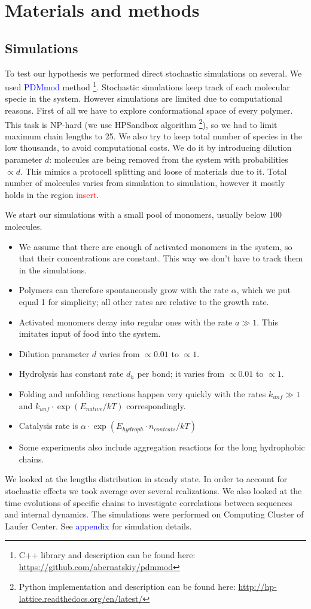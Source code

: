\documentclass[12pt]{paper}
\newcommand{\ga}{\alpha}
\newcommand{\red}[1]{\textcolor{red}{#1}}
\newcommand{\blue}[1]{\textcolor{blue}{#1}}
\begin{document}
\section{Materials and methods}
\subsection{Simulations}
To test our hypothesis we performed direct stochastic simulations on several. We used 
\blue{PDMmod} method \cite{Bernatskiy}\footnote{C++ library and description can be found 
here: \url{https://github.com/abernatskiy/pdmmod}}. Stochastic simulations keep track of each 
molecular specie in the system. However simulations are limited due to computational reasons. First 
of all we have to explore conformational space of every polymer. This task is NP-hard (we use 
HPSandbox algorithm\cite{lau1989lattice,Dill2008} \footnote{Python implementation and description 
can be found here: \url{http://hp-lattice.readthedocs.org/en/latest/}}), so we had to limit 
maximum chain lengths to 25. We also try to keep total number of species in the low thousands, to 
avoid computational costs. We do it by introducing dilution parameter $d$: molecules are being 
removed from the system with probabilities $\propto d$. This mimics a protocell splitting and 
loose of materials due to it. Total number of molecules varies from simulation to simulation, 
however it mostly holds in the region \red{insert}.

We start our simulations with a small pool of monomers, usually below 100 molecules. 
\begin{itemize}
 \item We assume 
that there are enough of activated monomers in the system, so that their concentrations are 
constant. This way we don't have to track them in the simulations.
\item Polymers can therefore 
spontaneously grow with the rate $\ga$, which we put equal 1 for simplicity; all other rates are 
relative to the growth rate.
\item Activated monomers decay into regular ones with the rate $a\gg1$. This 
imitates input of food into the system. 
\item Dilution parameter $d$ varies from $\propto 0.01$ to 
$\propto 1$.
\item Hydrolysis has constant rate $d_h$ per bond; it varies from $\propto 0.01$ to $\propto 1$.
\item Folding and unfolding reactions happen very quickly with the rates $k_{unf}\gg1$ and 
$k_{unf}\cdot\exp(E_{native}/kT)$ correspondingly.
\item Catalysis rate is $\ga\cdot\exp(E_{hydroph}\cdot n_{contcats}/kT)$
\item Some experiments also include aggregation reactions for the long hydrophobic chains.
\end{itemize}
We looked at the lengths distribution in steady state. In order to account for stochastic effects 
we took average over several realizations. We also looked at the time evolutions of specific 
chains to investigate correlations between sequences and internal dynamics. The simulations were 
performed on Computing Cluster of Laufer Center. See \blue{appendix} for simulation details.
\end{document}
